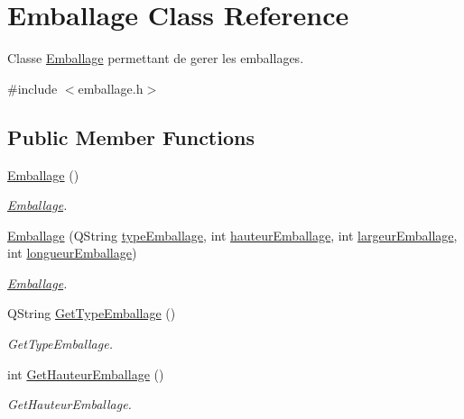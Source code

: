 \hypertarget{class_emballage}{}\section{Emballage Class Reference}
\label{class_emballage}


Classe \mbox{\hyperlink{class_emballage}{Emballage}} permettant de gerer les emballages.  




{\ttfamily \#include $<$emballage.\+h$>$}

\subsection*{Public Member Functions}
\begin{DoxyCompactItemize}
\item 
\mbox{\label{class_emballage_ab800d6046cc44752ea9b769a6803a18a}} 
\mbox{\hyperlink{class_emballage_ab800d6046cc44752ea9b769a6803a18a}{Emballage}} ()
\begin{DoxyCompactList}\small\item\em \mbox{\hyperlink{class_emballage}{Emballage}}. \end{DoxyCompactList}\item 
\mbox{\hyperlink{class_emballage_ae74a1117a30e239442418bb49a69db47}{Emballage}} (Q\+String \mbox{\hyperlink{class_emballage_a1a939a1b7ff146dbcfe585a59f53174c}{type\+Emballage}}, int \mbox{\hyperlink{class_emballage_a8fdf2bff797b5405db34cbb365f02642}{hauteur\+Emballage}}, int \mbox{\hyperlink{class_emballage_a1fe866728576ec8ee38a0c647e1f1bab}{largeur\+Emballage}}, int \mbox{\hyperlink{class_emballage_a4c9b0f9c3e617eceac9f557177356e85}{longueur\+Emballage}})
\begin{DoxyCompactList}\small\item\em \mbox{\hyperlink{class_emballage}{Emballage}}. \end{DoxyCompactList}\item 
Q\+String \mbox{\hyperlink{class_emballage_a5662f2d4aae61a7c999a4d26dd82fa14}{Get\+Type\+Emballage}} ()
\begin{DoxyCompactList}\small\item\em Get\+Type\+Emballage. \end{DoxyCompactList}\item 
int \mbox{\hyperlink{class_emballage_a8face654d3e58ac8137c6cffa5d7506e}{Get\+Hauteur\+Emballage}} ()
\begin{DoxyCompactList}\small\item\em Get\+Hauteur\+Emballage. \end{DoxyCompactList}\item 

\end{DoxyCompactItemize}
